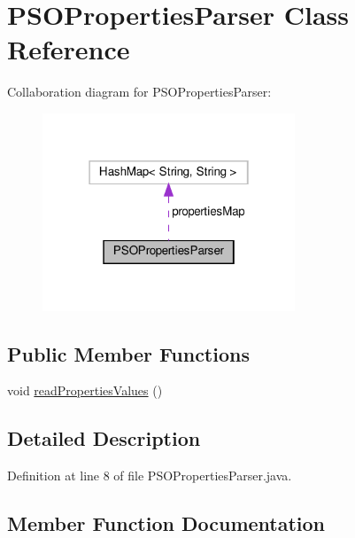 \hypertarget{class_p_s_o_properties_parser}{}\section{P\+S\+O\+Properties\+Parser Class Reference}
\label{class_p_s_o_properties_parser}


Collaboration diagram for P\+S\+O\+Properties\+Parser\+:\nopagebreak
\begin{figure}[H]
\begin{center}
\leavevmode
\includegraphics[width=214pt]{class_p_s_o_properties_parser__coll__graph}
\end{center}
\end{figure}
\subsection*{Public Member Functions}
\begin{DoxyCompactItemize}
\item 
void \hyperlink{class_p_s_o_properties_parser_a3165e06c1942985eaac001b29648b8c8}{read\+Properties\+Values} ()
\end{DoxyCompactItemize}


\subsection{Detailed Description}


Definition at line 8 of file P\+S\+O\+Properties\+Parser.\+java.



\subsection{Member Function Documentation}
\mbox{\label{class_p_s_o_properties_parser_a3165e06c1942985eaac001b29648b8c8}} 

